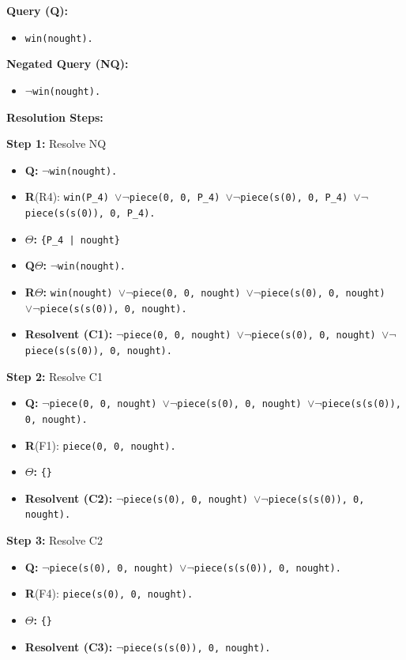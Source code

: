 \documentclass[10pt, a4paper]{article}
\begin{document}
    
\textbf{Query (Q):}
\begin{itemize}
    \item \texttt{win(nought).}
\end{itemize}

\textbf{Negated Query (NQ):}
\begin{itemize}
    \item \texttt{$\lnot$win(nought).}
\end{itemize}

\textbf{Resolution Steps:}

\textbf{Step 1:} Resolve NQ
\begin{itemize}
    \item \textbf{Q:} \texttt{$\lnot$win(nought).}
    \item \textbf{R}(R4): \texttt{win(P\_4) $\lor \lnot$piece(0, 0, P\_4) $\lor \lnot$piece(s(0), 0, P\_4) $\lor \lnot$piece(s(s(0)), 0, P\_4).}
    \item \textbf{$\Theta$:} \texttt{\{P\_4 | nought\}}
    \item \textbf{Q$\Theta$:} \texttt{$\lnot$win(nought).}
    \item \textbf{R$\Theta$:} \texttt{win(nought) $\lor \lnot$piece(0, 0, nought) $\lor \lnot$piece(s(0), 0, nought) $\lor \lnot$piece(s(s(0)), 0, nought).}
    \item \textbf{Resolvent (C1):} \texttt{$\lnot$piece(0, 0, nought) $\lor \lnot$piece(s(0), 0, nought) $\lor \lnot$piece(s(s(0)), 0, nought).}
\end{itemize}

\textbf{Step 2:} Resolve C1
\begin{itemize}
    \item \textbf{Q:} \texttt{$\lnot$piece(0, 0, nought) $\lor \lnot$piece(s(0), 0, nought) $\lor \lnot$piece(s(s(0)), 0, nought).}
    \item \textbf{R}(F1): \texttt{piece(0, 0, nought).}
    \item \textbf{$\Theta$:} \texttt{\{\}}
    \item \textbf{Resolvent (C2):} \texttt{$\lnot$piece(s(0), 0, nought) $\lor \lnot$piece(s(s(0)), 0, nought).}
\end{itemize}

\textbf{Step 3:} Resolve C2 
\begin{itemize}
    \item \textbf{Q:} \texttt{$\lnot$piece(s(0), 0, nought) $\lor \lnot$piece(s(s(0)), 0, nought).}
    \item \textbf{R}(F4): \texttt{piece(s(0), 0, nought).}
    \item \textbf{$\Theta$:} \texttt{\{\}}
    \item \textbf{Resolvent (C3):} \texttt{$\lnot$piece(s(s(0)), 0, nought).}
\end{itemize}
\end{document}
